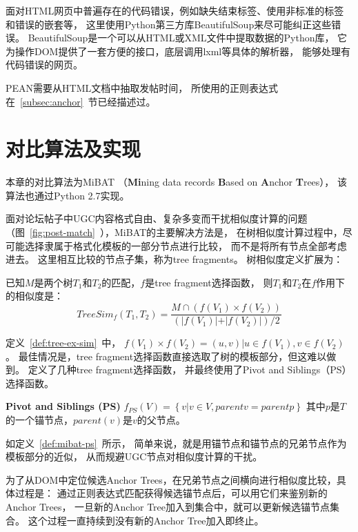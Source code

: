面对HTML网页中普遍存在的代码错误，例如缺失结束标签、使用非标准的标签和错误的嵌套等，
这里使用Python第三方库BeautifulSoup来尽可能纠正这些错误。
BeautifulSoup是一个可以从HTML或XML文件中提取数据的Python库，
它为操作DOM提供了一套方便的接口，底层调用lxml等具体的解析器，
能够处理有代码错误的网页。

PEAN需要从HTML文档中抽取发帖时间，
所使用的正则表达式在~\ref{subsec:anchor}~节已经描述过。

\section{对比算法及实现}
\label{sec:pean-other}

本章的对比算法为MiBAT
（\textbf{Mi}ning data records 
\textbf{B}ased on \textbf{A}nchor \textbf{T}rees），
该算法也通过Python 2.7实现。

面对论坛帖子中UGC内容格式自由、复杂多变而干扰相似度计算的问题
（图~\ref{fig:post-match}~），MiBAT的主要解决方法是，
在树相似度计算过程中，尽可能选择隶属于格式化模板的一部分节点进行比较，
而不是将所有节点全部考虑进去。
这里相互比较的节点子集，称为tree fragments。
树相似度定义扩展为：

\begin{definition}
\label{def:tree-ex-sim}
已知$M$是两个树$T_1$和$T_2$的匹配，$f$是tree fragment选择函数，
则$T_1$和$T_2$在$f$作用下的相似度是：
\begin{equation}
TreeSim_f(T_1, T_2) = \frac{M \cap (f(V_1) \times f(V_2))}
{(\vert f(V_1) \vert + \vert f(V_2) \vert) / 2}
\end{equation}
\end{definition}

定义~\ref{def:tree-ex-sim}~中，
$f(V_1) \times f(V_2) = {(u,v) \vert u \in f(V_1), v \in f(V_2)}$。
最佳情况是，tree fragment选择函数直接选取了树的模板部分，但这难以做到。
\cite{song2010automatic}定义了几种tree fragment选择函数，
并最终使用了Pivot and Siblings（PS）选择函数。

\begin{definition}
\label{def:mibat-ps}
\textbf{Pivot and Siblings (PS)}
$f_{PS}(V) = \left\{ v \vert v \in V, parent{v} = parent{p} \right\}$
其中$p$是$T$的一个锚节点，$parent(v)$是$v$的父节点。
\end{definition}

如定义~\ref{def:mibat-ps}~所示，
简单来说，就是用锚节点和锚节点的兄弟节点作为模板部分的近似，
从而规避UGC节点对相似度计算的干扰。

为了从DOM中定位候选Anchor Trees，在兄弟节点之间横向进行相似度比较，具体过程是：
通过正则表达式匹配获得候选锚节点后，可以用它们来鉴别新的Anchor Trees，
一旦新的Anchor Tree加入到集合中，就可以更新候选锚节点集合。
这个过程一直持续到没有新的Anchor Tree加入即终止。

